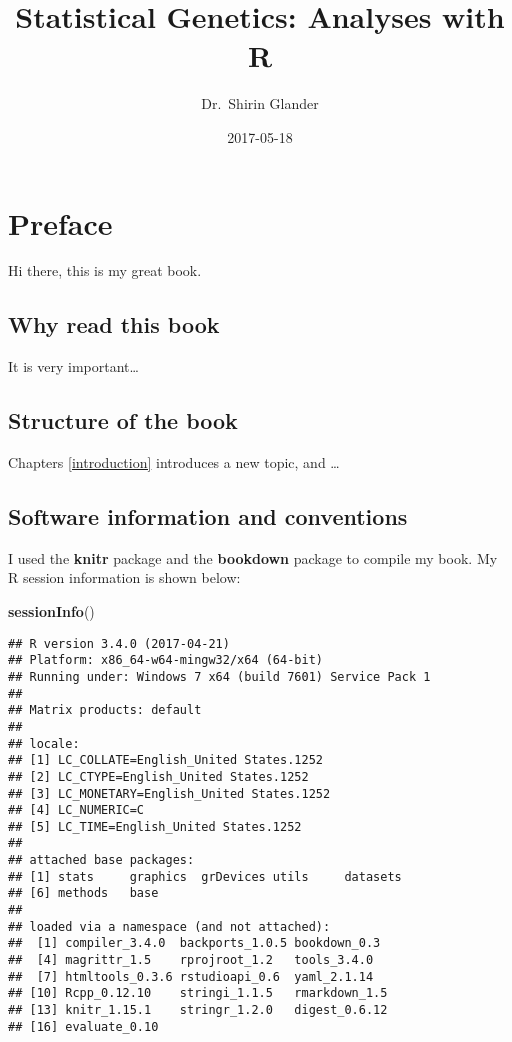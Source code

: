 \documentclass[12pt,]{krantz}
\title{Statistical Genetics: Analyses with R}
\author{Dr.~Shirin Glander}
\date{2017-05-18}
\newenvironment{Shaded}{\begin{snugshade}}{\end{snugshade}}
\newcommand{\KeywordTok}[1]{\textcolor[rgb]{0.27,0.27,0.27}{\textbf{{#1}}}}
\newcommand{\NormalTok}[1]{{#1}}
\begin{document}
\maketitle

\pagestyle{empty}\cleardoublepage\newpage

\frontmatter

{
\hypersetup{linkcolor=black}
\setcounter{tocdepth}{1}
\tableofcontents
}
\listoftables
\listoffigures
\chapter*{Preface}\label{preface}


Hi there, this is my great book.

\section*{Why read this book}\label{why-read-this-book}


It is very important\ldots{}

\section*{Structure of the book}\label{structure-of-the-book}


Chapters \ref{introduction} introduces a new topic, and \ldots{}

\section*{Software information and
conventions}\label{software-information-and-conventions}


I used the \textbf{knitr} package and the
\textbf{bookdown} package to compile my book. My R
session information is shown below:

\begin{Shaded}
\begin{Highlighting}[]
\KeywordTok{sessionInfo}\NormalTok{()}
\end{Highlighting}
\end{Shaded}

\begin{verbatim}
## R version 3.4.0 (2017-04-21)
## Platform: x86_64-w64-mingw32/x64 (64-bit)
## Running under: Windows 7 x64 (build 7601) Service Pack 1
## 
## Matrix products: default
## 
## locale:
## [1] LC_COLLATE=English_United States.1252 
## [2] LC_CTYPE=English_United States.1252   
## [3] LC_MONETARY=English_United States.1252
## [4] LC_NUMERIC=C                          
## [5] LC_TIME=English_United States.1252    
## 
## attached base packages:
## [1] stats     graphics  grDevices utils     datasets 
## [6] methods   base     
## 
## loaded via a namespace (and not attached):
##  [1] compiler_3.4.0  backports_1.0.5 bookdown_0.3   
##  [4] magrittr_1.5    rprojroot_1.2   tools_3.4.0    
##  [7] htmltools_0.3.6 rstudioapi_0.6  yaml_2.1.14    
## [10] Rcpp_0.12.10    stringi_1.1.5   rmarkdown_1.5  
## [13] knitr_1.15.1    stringr_1.2.0   digest_0.6.12  
## [16] evaluate_0.10
\end{verbatim}
\end{document}
